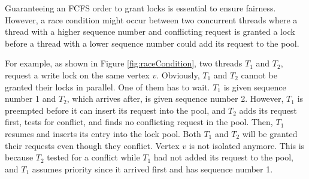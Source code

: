


Guaranteeing an FCFS order to grant locks is essential to ensure fairness. However, a race condition might occur between two concurrent threads where a thread with a higher sequence number and conflicting request is granted a lock before a thread with a lower sequence number could add its request to the pool. 

For example, as shown in Figure \ref{fig:raceCondition}, two threads $T_1$ and $T_2$, request a write lock on the same vertex $v$. Obviously, $T_1$ and $T_2$ cannot be granted their locks in parallel. One of them has to wait. $T_1$ is given sequence number 1 and $T_2$, which arrives after, is given sequence number 2. However, $T_1$ is preempted before it can insert its request into the pool, and $T_2$ adds its request first, tests for conflict, and finds no conflicting request in the pool. Then, $T_1$ resumes and inserts its entry into the lock pool. 
Both $T_1$ and $T_2$ will be granted their requests even though they conflict. Vertex $v$ is not isolated anymore. This is because $T_2$ tested for a conflict while $T_1$ had not added its request to the pool, and $T_1$ assumes priority since it arrived first and has sequence number 1.


